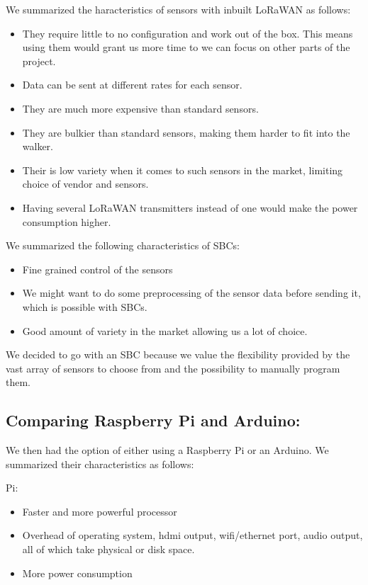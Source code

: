 		We summarized the haracteristics of sensors with inbuilt LoRaWAN as follows:
		\begin{itemize}
			\item They require little to no configuration and work out of the box. This means using them would grant us more time to we can focus on other parts of the project.
			\item Data can be sent at different rates for each sensor.
			\item They are much more expensive than standard sensors.
			\item They are bulkier than standard sensors, making them harder to fit into the walker.
			\item Their is low variety when it comes to such sensors in the market, limiting choice of vendor and sensors.
			\item Having several LoRaWAN transmitters instead of one would make the power consumption higher.
		\end{itemize}


		We summarized the following characteristics of SBCs:
		\begin{itemize}
			\item Fine grained control of the sensors
			\item We might want to do some preprocessing of the sensor data before sending it, which is possible with SBCs.
			\item Good amount of variety in the market allowing us a lot of choice.
		\end{itemize}

		We decided to go with an SBC because we value the flexibility provided by the vast array of sensors to choose from and the possibility to manually program them.



\subsection{Comparing Raspberry Pi and Arduino:}

	We then had the option of either using a Raspberry Pi or an Arduino. We summarized their characteristics as follows:

	Pi:
	\begin{itemize}
		\item Faster and more powerful processor
		\item Overhead of operating system, hdmi output, wifi/ethernet port, audio output, all of which take physical or disk space.
		\item More power consumption
	\end{itemize}

